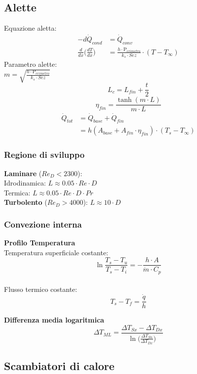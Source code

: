 \documentclass[landscape,a4paper]{article}
\begin{document}
\begin{multicols}{4}
\subsection*{Alette}
Equazione aletta:
\begin{align*}
	-d\dot{Q}_{cond} &= \dot{Q}_{conv} \\
	\frac{d}{dx} \big( \frac{dT}{dx} \big) &= \frac{h\cdot \text{P}_{erimetro}}{k_s\cdot Sez} \cdot (T-T_{\infty})
\end{align*}
Parametro alette: \\
\(m=\sqrt{\frac{h\cdot \text{P}_{erimetro}}{k_s\cdot Sez}}\)
\[L_{c} = L_{fin} + \frac {t}{2} \]
\[\eta_{fin} = \frac{\tanh(m\cdot L)}{m\cdot L}\]
\begin{align*}
\dot{Q}_{tot} &= \dot{Q}_{base} + \dot{Q}_{fin} \\
&= h(A_{base} + A_{fin} \cdot \eta_{fin} ) \cdot (T_s-T_{\infty})
\end{align*}

\subsubsection*{Regione di sviluppo}
\textbf{Laminare} ($Re_D<2300$):\\
Idrodinamica: \(L \approx 0.05\cdot Re\cdot D\) \\
Termica: \(L \approx 0.05\cdot Re\cdot D\cdot Pr\) \\
\textbf{Turbolento} ($Re_D>4000$): \(L \approx 10\cdot D\) \\

\subsubsection*{Convezione interna}
\textbf{Profilo Temperatura} \\
Temperatura superficiale costante:
\[\ln \frac{T_s -T_u}{T_s - T_i} = -\frac{h\cdot A}{\dot{m}\cdot C_p}\] \\
Flusso termico costante:
\[T_s - T_f = \frac{\dot{q}}{h}\]

\textbf{Differenza media logaritmica}
\[ \Delta T_{ML} = \frac {\Delta T_{Sx}-\Delta T_{Dx}} { \ln \Big( \frac { \Delta T_{Sn}}{\Delta T_{Dx}} \Big) }   \]

\subsection*{Scambiatori di calore}


\end{multicols}
\end{document}
